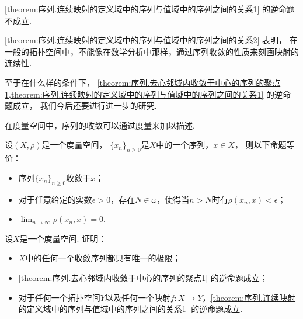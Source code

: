 \begin{proposition}\label{theorem:序列.连续映射的定义域中的序列与值域中的序列之间的关系2}
\cref{theorem:序列.连续映射的定义域中的序列与值域中的序列之间的关系1} 的逆命题不成立.
\end{proposition}

\cref{theorem:序列.连续映射的定义域中的序列与值域中的序列之间的关系2} 表明，
在一般的拓扑空间中，不能像在数学分析中那样，通过序列收敛的性质来刻画映射的连续性.

至于在什么样的条件下，
\cref{theorem:序列.去心邻域内收敛于中心的序列的聚点1,theorem:序列.连续映射的定义域中的序列与值域中的序列之间的关系1} 的逆命题成立，
我们今后还要进行进一步的研究.

在度量空间中，序列的收敛可以通过度量来加以描述.
\begin{theorem}
设\((X,\rho)\)是一个度量空间，
\(\{x_n\}_{n\geq0}\)是\(X\)中的一个序列，\(x \in X\)，
则以下命题等价：\begin{itemize}
	\item 序列\(\{x_n\}_{n\geq0}\)收敛于\(x\)；
	\item 对于任意给定的实数\(\epsilon>0\)，存在\(N\in\omega\)，使得当\(n>N\)时有\(\rho(x_n,x)<\epsilon\)；
	\item \(\lim_{n\to\infty} \rho(x_n,x) = 0\).
\end{itemize}
\end{theorem}

\begin{example}
设\(X\)是一个度量空间.
证明：\begin{itemize}
	\item \(X\)中的任何一个收敛序列都只有唯一的极限；
	\item \cref{theorem:序列.去心邻域内收敛于中心的序列的聚点1} 的逆命题成立；
	\item 对于任何一个拓扑空间\(Y\)以及任何一个映射\(f\colon X \to Y\)，\cref{theorem:序列.连续映射的定义域中的序列与值域中的序列之间的关系1} 的逆命题成立.
\end{itemize}
\end{example}

